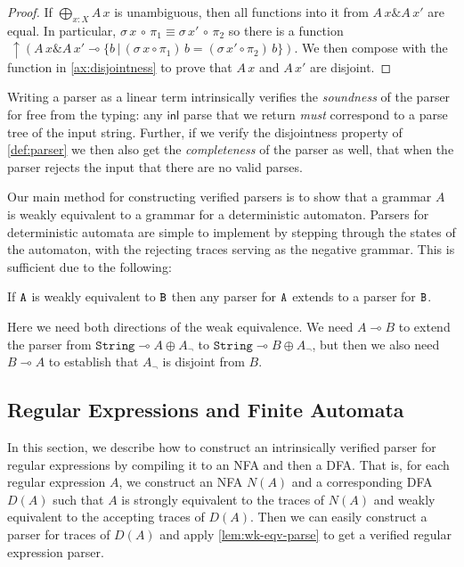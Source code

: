 \documentclass[acmsmall,nonacm]{acmart}
\newcommand{\inl}{\mathsf{inl}}
\newcommand{\lto}{\multimap}
\newcommand{\StringGram}{\texttt{String}}
\newcommand{\ltonl}[1]{~\uparrow #1}
\newcommand{\applto}[2]{#1 \, #2}
\newcommand{\LinSigTy}[3]{\textstyle\bigoplus_{#1 : #2} #3}
\newcommand{\equalizer}[3]{\{#1\,|\,\applto {#2}{#1} = \applto{#3}{#1} \}}
\newcommand{\agdalogo}{%
  \usebox{\logoagdabox}}%
\newcommand{\zenodolink}{https://zenodo.org/records/15049780}
\newcommand{\Agda}{\href{\zenodolink}{\agdalogo}}
\begin{document}
\begin{proof}
If $\LinSigTy{x}{X}{A\,x}$ is unambiguous, then all functions into it from
$A\,x \& A\,x'$ are equal. In particular,
$\sigma\,x\,\circ\,\pi_{1} \equiv \sigma\,x'\,\circ\,\pi_{2}$ so there is a
function \(
\ltonl{\left(A\,x \& A\,x' \lto
  \equalizer{b}{\left( \sigma\,x \circ \pi_1 \right)}{\left(  \sigma\,x'\circ \pi_2 \right)}
\right)}.
\)
We then compose with the function in \cref{ax:disjointness} to prove that $A\,x$ and $A\,x'$ are disjoint.
\end{proof}

Writing a parser as a linear term intrinsically verifies the \emph{soundness} of
the parser for free from the typing: any $\inl$ parse that we return \emph{must}
correspond to a parse tree of the input string. Further, if we verify the
disjointness property of \cref{def:parser} we then also get the
\emph{completeness} of the parser as well, that when the parser rejects the
input that there are no valid parses.

Our main method for constructing verified parsers is to show that a
grammar $A$ is weakly equivalent to a grammar for a deterministic
automaton. Parsers for deterministic automata are simple to implement
by stepping through the states of the automaton, with the rejecting
traces serving as the negative grammar. This is sufficient due to the
following:
\begin{lemma}[\Agda]
  \label{lem:wk-eqv-parse}
  If $\texttt{A}$ is weakly equivalent to $\texttt{B}$ then any parser for $\texttt{A}$ extends to a
  parser for $\texttt{B}$.
\end{lemma}
Here we need both directions of the weak equivalence. We need $A \lto
B$ to extend the parser from $\StringGram \lto A \oplus A_{\neg}$ to
$\StringGram \lto B \oplus A_{\neg}$, but then we also need $B \lto A$ to
establish that $A_{\neg}$ is disjoint from $B$.

\subsection{Regular Expressions and Finite Automata}

In this section, we describe how to construct an intrinsically
verified parser for regular expressions by compiling it to an NFA and
then a DFA. That is, for each regular expression $A$, we construct an
NFA $N(A)$ and a corresponding DFA $D(A)$ such that $A$ is strongly
equivalent to the traces of $N(A)$ and weakly equivalent to the
accepting traces of $D(A)$. Then we can easily construct a parser for
traces of $D(A)$ and apply \cref{lem:wk-eqv-parse} to get
a verified regular expression parser.
\end{document}
